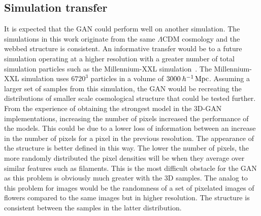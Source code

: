\documentclass[twocolumn]{article}
\numberwithin{equation}{section}
\begin{document}



\subsection{Simulation transfer}
It is expected that the GAN could perform well on another simulation. The simulations in this work originate from the same 
$\Lambda \text{CDM}$ cosmology and the webbed structure is consistent. An informative transfer would be to a future 
simulation operating at a higher resolution with a greater number of total simulation particles such as the Millennium-XXL 
simulation~\cite{millxxlsim}. The Millennium-XXL simulation uses $6720^3$ particles in a volume of $3000 \: h^{-1} 
\,\textup{Mpc}$. Assuming a larger set of samples from this simulation, the GAN would be recreating the distributions of 
smaller scale cosmological structure that could be tested further. From the experience of obtaining the strongest model in
the 3D-GAN implementations, increasing the number of pixels increased the performance of the models. This could be due to 
a lower loss of information between an increase in the number of pixels for a pixel in the previous resolution. The 
appearance of the structure is better defined in this way. The lower the number of pixels, the more randomly distributed 
the pixel densities will be when they average over similar features such as filaments. This is the most difficult obstacle
for the GAN as this problem is obviously much greater with the 3D samples. The analog to this problem for images would be
the randomness of a set of pixelated images of flowers compared to the same images but in higher resolution. The structure
is consistent between the samples in the latter distribution. 
\end{document}
